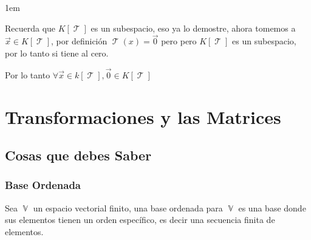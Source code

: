 \documentclass[12pt, fleqn]{report}                             %
\newenvironment{SmallIndentation}[1][0.75em]                    %
        {\begin{adjustwidth}{#1}{}\begin{footnotesize}}             %
        {\end{footnotesize}\end{adjustwidth}}                       %
\theoremstyle{break}                                            %
\DeclareMathOperator \VectorSet    {\mathbb{V}}                 %
\DeclareMathOperator \LinTrans      {\mathcal{T}}               %
\begin{document}
\begin{itemize}
\begin{SmallIndentation}[1em]
                            Recuerda que $K[\LinTrans]$ es un subespacio, eso ya lo demostre, ahora tomemos 
                            a $\vec x \in K[\LinTrans]$, por definición $\LinTrans(x) = \vec 0$
                            pero pero $K[\LinTrans]$ es un subespacio, por lo tanto si tiene al cero.
                            
                            Por lo tanto
                            $\forall \vec x \in k[\LinTrans], \vec 0 \in K[\LinTrans]$
                        
                        \end{SmallIndentation}
                            
                \end{itemize}


    \chapter{Transformaciones y las Matrices}


        \clearpage
        \section{Cosas que debes Saber}

            \subsection{Base Ordenada}

                Sea $\VectorSet$ un espacio vectorial finito, una base ordenada para $\VectorSet$
                es una base donde sus elementos tienen un orden específico, es decir una secuencia
                finita de elementos.

\end{document}
